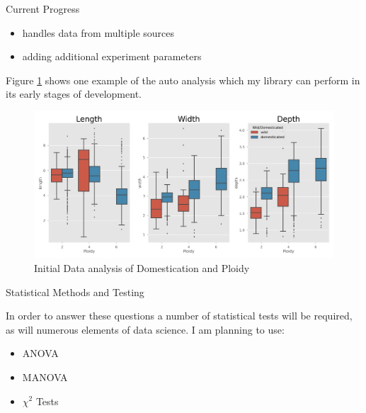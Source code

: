 \documentclass[final]{beamer}
\begin{document}
\begin{frame}{}
\begin{textblock}{27.7}
\begin{block}{Current Progress}
\begin{multicols}{2}
        \columnbreak

        \begin{itemize}
        \item handles data from multiple sources
        \item adding additional experiment parameters
        \end{itemize}

      \end{multicols}

      \vspace{0.5cm}

      Figure \ref{fig:initalboxplots} shows one example of the auto analysis which my library
      can perform in its early stages of development.
      
      \begin{figure}[htb]
        \centering
        \includegraphics[width=22cm]{domesticated.png}
        \caption{\label{fig:initalboxplots}Initial Data analysis of Domestication and Ploidy}
      \end{figure}
      
    \end{block}

    
    \begin{block}{Statistical Methods and Testing}

      In order to answer these questions a number of statistical tests will be required,
      as will numerous elements of data science. I am planning to use:

      \begin{multicols}{2}

        \begin{itemize}
        \item ANOVA
        \item MANOVA
        \item $\chi^2$ Tests
        \end{itemize}


\end{multicols}
\end{block}
\end{textblock}
\end{frame}
\end{document}
